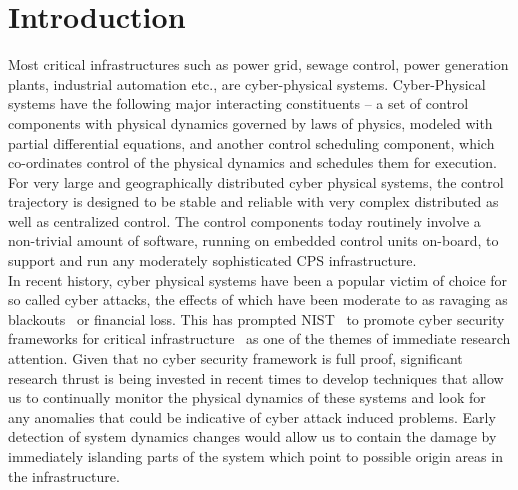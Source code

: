 \section{Introduction} \label{sec:intro}
\noindent
Most critical infrastructures such as power grid, sewage control, power generation plants, industrial automation etc., are cyber-physical systems. Cyber-Physical systems have the following major interacting constituents -- a set of control components with physical dynamics governed by laws of physics, modeled with partial differential equations, and another control scheduling component, which co-ordinates control of the physical dynamics and schedules them for execution. For very large and geographically distributed cyber physical systems, the control trajectory is designed to be stable and reliable with very complex distributed as well as centralized control. The control components today 
routinely involve a non-trivial amount of software, running on embedded control units on-board, to support and run any moderately sophisticated CPS infrastructure. \\

\noindent
In recent history, cyber physical systems have been a popular victim of choice for so called cyber attacks, the effects of which have been moderate to as ravaging as blackouts~\cite{blackout} or financial loss. This has prompted 
NIST~\cite{nist} to promote cyber security frameworks for critical infrastructure~\cite{cs-Framewrok} as 
one of the themes of immediate research attention. Given that no cyber security framework is full proof, significant research thrust is being invested in recent times to develop techniques that allow us to continually monitor the physical dynamics of these systems and look for any anomalies that could be indicative of cyber attack induced problems. Early detection of system dynamics changes would allow us to contain the damage by immediately islanding parts of the system which point to possible origin areas in the infrastructure. \\

